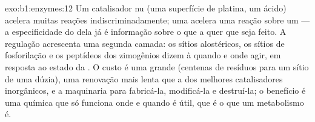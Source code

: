 \begin{solution}{exo:b1:enzymes:12}
Um catalisador nu (uma superfície de platina, um ácido) acelera muitas
reações indiscriminadamente; uma  acelera uma reação sobre um
 --- a especificidade do  dela já é informação sobre
o que a  quer que seja feito. A regulação acrescenta uma segunda
camada: os sítios alostéricos, os sítios de fosforilação e os peptídeos
dos zimogênios dizem à  quando e onde agir, em resposta ao estado
da . O custo é uma  grande (centenas de resíduos para um
sítio de uma dúzia), uma renovação mais lenta que a dos melhores
catalisadores inorgânicos, e a maquinaria para fabricá-la, modificá-la e
destruí-la; o benefício é uma química que só funciona onde e quando é
útil, que é o que um metabolismo é.
\end{solution}

